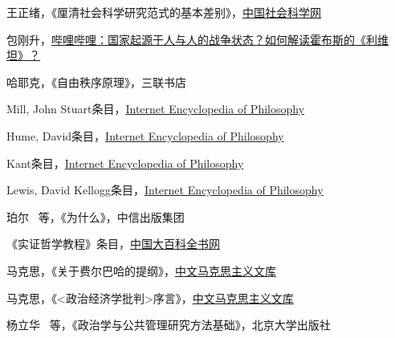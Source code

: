 \newpage
\thispagestyle{empty}
\begin{thebibliography}{99}
	王正绪，《厘清社会科学研究范式的基本差别》，\href{https://www.cssn.cn/skgz/bwyc/202409/t20240913_5777429.shtml}{中国社会科学网}
	
	包刚升，\href{https://www.bilibili.com/video/BV1S2HsePERE}{哔哩哔哩：国家起源于人与人的战争状态？如何解读霍布斯的《利维坦》？}
	
	哈耶克，《自由秩序原理》，三联书店
	
	Mill, John Stuart条目，\href{https://iep.utm.edu/milljs/}{Internet Encyclopedia of Philosophy}
	
	Hume, David条目，\href{https://iep.utm.edu/hume/}{Internet Encyclopedia of Philosophy}
 
	Kant条目，\href{https://iep.utm.edu/kantview/}{Internet Encyclopedia of Philosophy}
 
	Lewis, David Kellogg条目，\href{https://iep.utm.edu/d-lewis/}{Internet Encyclopedia of Philosophy}
 
	珀尔 \ 等，《为什么》，中信出版集团
 
	《实证哲学教程》条目，\href{https://www.zgbk.com/ecph/words?SiteID=1&ID=399321}{中国大百科全书网}
	
	马克思，《关于费尔巴哈的提纲》，\href{https://www.marxists.org/chinese/marx/marxist.org-chinese-marx-1845.htm}{中文马克思主义文库}
	
	马克思，《<政治经济学批判>序言》，\href{https://www.marxists.org/chinese/marx/06.htm}{中文马克思主义文库}
	
	杨立华 \ 等，《政治学与公共管理研究方法基础》，北京大学出版社
\end{thebibliography}